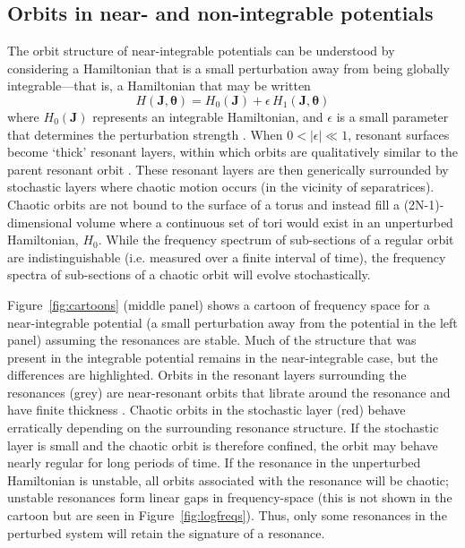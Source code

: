 \documentclass{mn2e}
\newcommand{\bs}[1]{\boldsymbol{#1}}
\begin{document}
\subsection{Orbits in near- and non-integrable potentials}

The orbit structure of near-integrable potentials can be understood by considering a Hamiltonian that is a small perturbation away from being globally integrable---that is, a Hamiltonian that may be written
\begin{equation}
	H(\boldsymbol{J}, \boldsymbol{\theta}) = H_0(\boldsymbol{J}) + \epsilon \, H_1(\boldsymbol{J}, \boldsymbol{\theta})
\end{equation}
where $H_0(\bs{J})$ represents an integrable Hamiltonian, and $\epsilon$ is a small parameter that determines the perturbation strength \citep[a description of perturbation theory applied to nonlinear Hamiltonians is given in][]{lichtenberg83}. When $0 < |\epsilon| \ll 1$, resonant surfaces become `thick' resonant layers, within which orbits are qualitatively similar to the parent resonant orbit \citep[e.g.,][]{merritt99}. These resonant layers are then generically surrounded by stochastic layers where chaotic motion occurs (in the vicinity of separatrices). Chaotic orbits are not bound to the surface of a torus and instead fill a (2N-1)-dimensional volume where a continuous set of tori would exist in an unperturbed Hamiltonian, $H_0$. While the frequency spectrum of sub-sections of a regular orbit are indistinguishable (i.e. measured over a finite interval of time), the frequency spectra of sub-sections of a chaotic orbit will evolve stochastically.

Figure~\ref{fig:cartoons} (middle panel) shows a cartoon of frequency space for a near-integrable potential (a small perturbation away from the potential in the left panel) assuming the resonances are stable. Much of the structure that was present in the integrable potential remains in the near-integrable case, but the differences are highlighted. Orbits in the resonant layers surrounding the resonances (grey) are near-resonant orbits that librate around the resonance and have finite thickness \citep[e.g.,][]{merritt99}. Chaotic orbits in the stochastic layer (red) behave erratically depending on the surrounding resonance structure. If the stochastic layer is small and the chaotic orbit is therefore confined, the orbit may behave nearly regular for long periods of time. If the resonance in the unperturbed Hamiltonian is unstable, all orbits associated with the resonance will be chaotic; unstable resonances form linear gaps in frequency-space (this is not shown in the cartoon but are seen in Figure~\ref{fig:logfreqs}). Thus, only some resonances in the perturbed system will retain the signature of a resonance.
\end{document}
